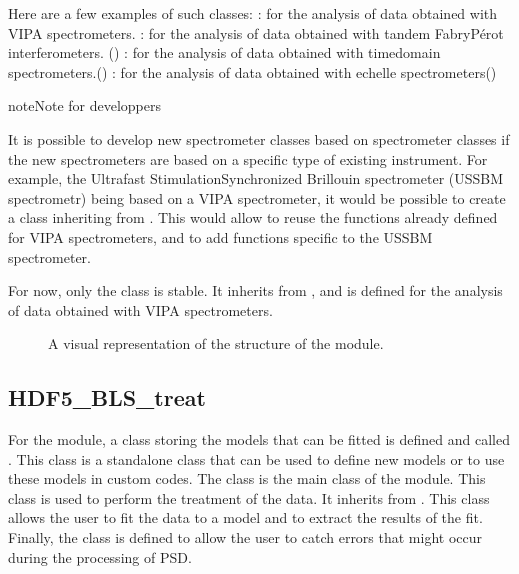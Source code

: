 \documentclass[letterpaper,10pt,english]{sphinxmanual}
\begin{document}
\sphinxAtStartPar
Here are a few examples of such classes:
\sphinxhyphen{} : for the analysis of data obtained with VIPA spectrometers.
\sphinxhyphen{} : for the analysis of data obtained with tandem Fabry\sphinxhyphen{}Pérot interferometers. ()
\sphinxhyphen{} : for the analysis of data obtained with time\sphinxhyphen{}domain spectrometers.()
\sphinxhyphen{} : for the analysis of data obtained with echelle spectrometers()

\begin{sphinxadmonition}{note}{Note for developpers}

\sphinxAtStartPar
It is possible to develop new spectrometer classes based on spectrometer classes if the new spectrometers are based on a specific type of existing instrument. For example, the Ultrafast Stimulation\sphinxhyphen{}Synchronized Brillouin spectrometer (USS\sphinxhyphen{}BM spectrometr) being based on a VIPA spectrometer, it would be possible to create a class  inheriting from . This would allow to reuse the functions already defined for VIPA spectrometers, and to add functions specific to the USS\sphinxhyphen{}BM spectrometer.
\end{sphinxadmonition}

\sphinxAtStartPar
For now, only the  class is stable. It inherits from , and is defined for the analysis of data obtained with VIPA spectrometers.

\begin{figure}[htbp]
\centering
\capstart

\noindent{}
\caption{A visual representation of the structure of the  module.}\label{\detokenize{source/data_processing:id1}}\end{figure}


\subsection{HDF5\_BLS\_treat}
\label{\detokenize{source/data_processing:hdf5-bls-treat}}
\sphinxAtStartPar
For the  module, a class storing the models that can be fitted is defined and called . This class is a standalone class that can be used to define new models or to use these models in custom codes. The class  is the main class of the module. This class is used to perform the treatment of the data. It inherits from . This class allows the user to fit the data to a model and to extract the results of the fit. Finally, the class  is defined to allow the user to catch errors that might occur during the processing of PSD.
\end{document}
